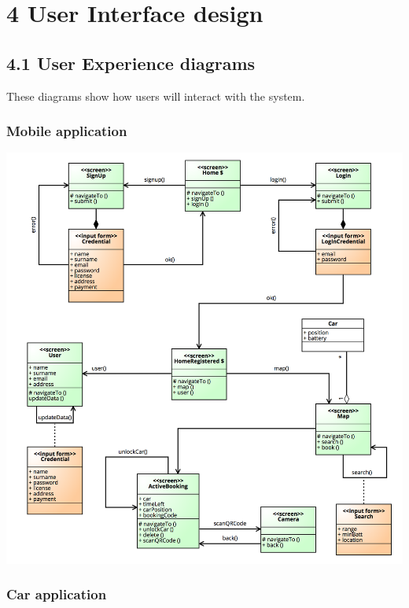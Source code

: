 \documentclass[]{article}
\begin{document}
\newpage

\section{4 User Interface design}\label{user-interface-design}

\subsection{4.1 User Experience
diagrams}\label{user-experience-diagrams}

These diagrams show how users will interact with the system.

\subsubsection{Mobile application}\label{mobile-application-1}

\centerline{\includegraphics{./images/UX_Mobile.png}}

\subsubsection{Car application}\label{car-application}
\end{document}

